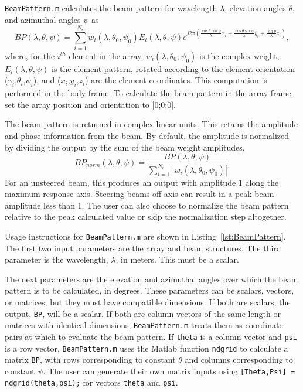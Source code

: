 \texttt{BeamPattern.m} calculates the beam pattern for wavelength $\lambda$, elevation angles $\theta$, and azimuthal angles $\psi$ as
\begin{equation}
BP(\lambda,\theta,\psi) = \sum_{i=1}^{N_e} w_i(\lambda,\theta_0,\psi_0)E_i(\lambda,\theta,\psi)e^{j2\pi\left(\frac{\cos\theta\cos\psi}{\lambda}x_i + \frac{\cos\theta\sin\psi}{\lambda}y_i + \frac{\sin\theta}{\lambda}z_i\right)},
\end{equation}
where, for the $i^{th}$ element in the array, $w_i(\lambda,\theta_0,\psi_0)$ is the complex weight, $E_i(\lambda,\theta,\psi)$ is the element pattern, rotated according to the element orientation ($\gamma_i$,$\theta_i$,$\psi_i$), and ($x_i$,$y_i$,$z_i$) are the element coordinates. This computation is performed in the body frame. To calculate the beam pattern in the array frame, set the array position and orientation to [0;0;0].

The beam pattern is returned in complex linear units. This retains the amplitude and phase information from the beam. By default, the amplitude is normalized by dividing the output by the sum of the beam weight amplitudes,
\begin{equation}
BP_{norm}(\lambda,\theta,\psi) = \frac{BP(\lambda,\theta,\psi)}{\sum_{i=1}^{N_e}|w_i(\lambda,\theta_0,\psi_0)|}.
\end{equation}
For an unsteered beam, this produces an output with amplitude 1 along the maximum response axis. Steering beams off axis can result in a peak beam amplitude less than 1. The user can also choose to normalize the beam pattern relative to the peak calculated value or skip the normalization step altogether.

Usage instructions for \texttt{BeamPattern.m} are shown in Listing~\ref{lst:BeamPattern}. The first two input parameters are the array and beam structures. The third parameter is the wavelength, $\lambda$, in meters. This must be a scalar. 

The next parameters are the elevation and azimuthal angles over which the beam pattern is to be calculated, in degrees. These parameters can be scalars, vectors, or matrices, but they must have compatible dimensions. If both are scalars, the output, \texttt{BP}, will be a scalar. If both are column vectors of the same length or matrices with identical dimensions, \texttt{BeamPattern.m} treats them as coordinate pairs at which to evaluate the beam pattern. If \texttt{theta} is a column vector and \texttt{psi} is a row vector, \texttt{BeamPattern.m} uses the Matlab function \texttt{ndgrid} to calculate a matrix \texttt{BP}, with rows corresponding to constant $\theta$ and columns corresponding to constant $\psi$. The user can generate their own matrix inputs using \texttt{[Theta,Psi] = ndgrid(theta,psi);} for vectors \texttt{theta} and \texttt{psi}.

